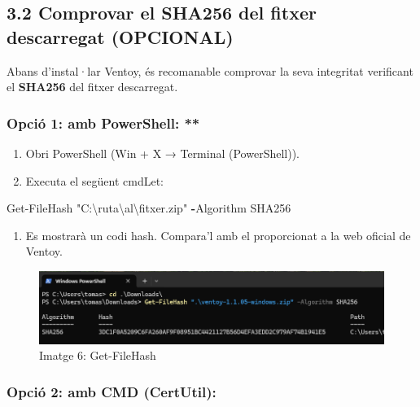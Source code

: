 \documentclass[
  12 pt,
  a4paper,
]{article}
\newenvironment{Shaded}{\begin{snugshade}}{\end{snugshade}}
\newcommand{\NormalTok}[1]{#1}
\newcommand{\OperatorTok}[1]{\textcolor[rgb]{0.81,0.36,0.00}{\textbf{#1}}}
\newcommand{\StringTok}[1]{\textcolor[rgb]{0.31,0.60,0.02}{#1}}
\providecommand{\tightlist}{%
  \setlength{\itemsep}{0pt}\setlength{\parskip}{0pt}}
\begin{document}
\subsection{3.2 Comprovar el SHA256 del fitxer descarregat
(OPCIONAL)}\label{comprovar-el-sha256-del-fitxer-descarregat-opcional}

Abans d'instal·lar Ventoy, és recomanable comprovar la seva integritat
verificant el \textbf{SHA256} del fitxer descarregat.

\subsubsection{Opció 1: amb PowerShell:
**}\label{opciuxf3-1-amb-powershell}

\begin{enumerate}
\def\labelenumi{\arabic{enumi}.}
\tightlist
\item
  Obri PowerShell (Win + X → Terminal (PowerShell)).\\
\item
  Executa el següent cmdLet:
\end{enumerate}

\begin{Shaded}
\begin{Highlighting}[]
\NormalTok{Get{-}FileHash }\StringTok{"C:\textbackslash{}ruta\textbackslash{}al\textbackslash{}fitxer.zip"} \OperatorTok{{-}}\NormalTok{Algorithm SHA256}
\end{Highlighting}
\end{Shaded}

\begin{enumerate}
\def\labelenumi{\arabic{enumi}.}
\setcounter{enumi}{2}
\tightlist
\item
  Es mostrarà un codi hash. Compara'l amb el proporcionat a la web
  oficial de Ventoy.
\end{enumerate}

\begin{figure}
\centering
\includegraphics{png/Get-FileHash.png}
\caption{Imatge 6: Get-FileHash}
\end{figure}

\subsubsection{Opció 2: amb CMD
(CertUtil):}\label{opciuxf3-2-amb-cmd-certutil}
\end{document}
